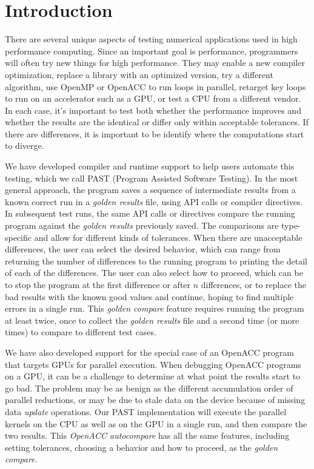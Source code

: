 \section{Introduction}

There are several unique aspects of testing numerical applications used in high performance computing.
Since an important goal is performance, programmers will often try new things for high performance.
They may enable a new compiler optimization, replace a library with an optimized version, try a different algorithm, use OpenMP or OpenACC to run loops in parallel, retarget key loops to run on an accelerator such as a GPU, or test a CPU from a different vendor.
In each case, it's important to test both whether the performance improves and whether the results are the identical or differ only within acceptable tolerances.
If there are differences, it is important to be identify where the computations start to diverge.

We have developed compiler and runtime support to help users automate this testing, which we call PAST (Program Assisted Software Testing).
In the most general approach, the program saves a sequence of intermediate results from a known correct run in a \emph{golden results} file, using API calls or compiler directives.
In subsequent test runs, the same API calls or directives compare the running program against the \emph{golden results} previously saved.
The comparisons are type-specific and allow for different kinds of tolerances.
When there are unacceptable differences, the user can select the desired behavior, which can range from returning the number of differences to the running program to printing the detail of each of the differences.
The user can also select how to proceed, which can be to stop the program at the first difference or after $n$ differences, or to replace the bad results with the known good values and continue, hoping to find multiple errors in a single run.
This \emph{golden compare} feature requires running the program at least twice, once to collect the \emph{golden results} file and a second time (or more times) to compare to different test cases.

We have also developed support for the special case of an OpenACC program that targets GPUs for parallel execution.
When debugging OpenACC programs on a GPU, it can be a challenge to determine at what point the results start to go bad.
The problem may be as benign as the different accumulation order of parallel reductions, or may be due to stale data on the device because of missing data \emph{update} operations.
Our PAST implementation will execute the parallel kernels on the CPU as well as on the GPU in a single run, and then compare the two results.
This \emph{OpenACC autocompare} has all the same features, including setting tolerances, choosing a behavior and how to proceed, as the \emph{golden compare}.

